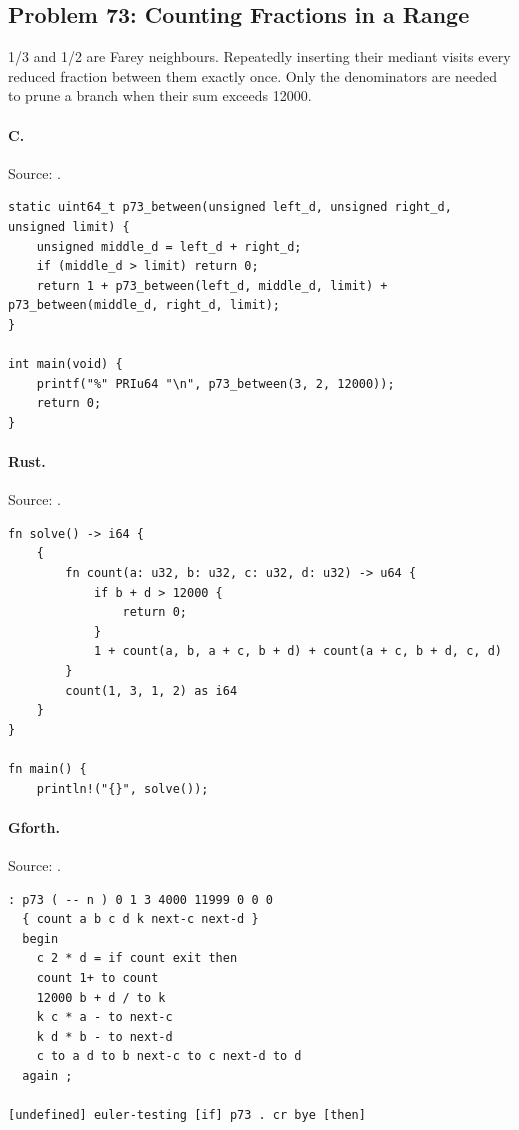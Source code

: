 \subsection{Problem 73: Counting Fractions in a Range}
\label{walkthrough:p73}
1/3 and 1/2 are Farey neighbours. Repeatedly inserting their mediant visits every reduced fraction between them exactly once. Only the denominators are needed to prune a branch when their sum exceeds 12000.

\paragraph{C.} Source: .
\begin{lstlisting}
static uint64_t p73_between(unsigned left_d, unsigned right_d, unsigned limit) {
    unsigned middle_d = left_d + right_d;
    if (middle_d > limit) return 0;
    return 1 + p73_between(left_d, middle_d, limit) + p73_between(middle_d, right_d, limit);
}

int main(void) {
    printf("%" PRIu64 "\n", p73_between(3, 2, 12000));
    return 0;
}
\end{lstlisting}

\paragraph{Rust.} Source: .
\begin{lstlisting}
fn solve() -> i64 {
    {
        fn count(a: u32, b: u32, c: u32, d: u32) -> u64 {
            if b + d > 12000 {
                return 0;
            }
            1 + count(a, b, a + c, b + d) + count(a + c, b + d, c, d)
        }
        count(1, 3, 1, 2) as i64
    }
}

fn main() {
    println!("{}", solve());
\end{lstlisting}

\paragraph{Gforth.} Source: .
\begin{lstlisting}
: p73 ( -- n ) 0 1 3 4000 11999 0 0 0
  { count a b c d k next-c next-d }
  begin
    c 2 * d = if count exit then
    count 1+ to count
    12000 b + d / to k
    k c * a - to next-c
    k d * b - to next-d
    c to a d to b next-c to c next-d to d
  again ;

[undefined] euler-testing [if] p73 . cr bye [then]
\end{lstlisting}

